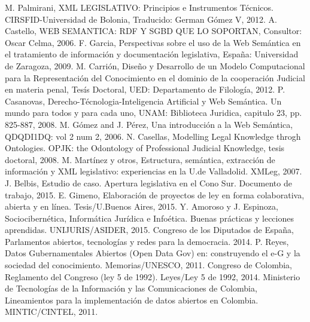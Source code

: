 \documentclass[conference]{IEEEtran}
\begin{document}
	\begin{thebibliography}{1}
		
		M. Palmirani, XML LEGISLATIVO: Principios e Instrumentos Técnicos. CIRSFID-Universidad de Bolonia, Traducido: German Gómez V, 2012. 
		A. Castello, WEB SEMANTICA: RDF Y SGBD QUE LO SOPORTAN, Consultor: Oscar Celma, 2006.
		F. Garcia, Perspectivas sobre el uso de la Web Semántica en el tratamiento de información y documentación legislativa, España: Universidad de Zaragoza, 2009.
		M. Carrión, Diseño y Desarrollo de un Modelo Computacional para la Representación del Conocimiento en el dominio de la cooperación Judicial en materia penal, Tesís Doctoral, UED: Departamento de Filología, 2012.
		P. Casanovas, Derecho-Técnologia-Inteligencia Artificial y Web Semántica. Un mundo para todos y para cada uno, UNAM: Biblioteca Juridica, capitulo 23, pp. 825-887, 2008.
		M. Gómez and J. Pérez, Una introducción a la Web Semántica, QDQDI1DQ: vol 2 num 2, 2006.
		N. Casellas, Modelling Legal Knowledge throgh Ontologies. OPJK: the Odontology of Professional Judicial Knowledge, tesis doctoral, 2008. 
		M. Martínez y otros, Estructura, semántica, extracción de información y XML legislativo: experiencias en la U.de Valladolid. XMLeg, 2007. 	
		J. Belbis, Estudio de caso. Apertura legislativa en el Cono Sur. Documento de trabajo, 2015. 	
		E. Gimeno, Elaboración de proyectos de ley en forma colaborativa, abierta y en línea. Tesis/U.Buenos Aires, 2015.	
	    Y. Amoroso y J. Espinoza, Sociocibernética, Informática Jurídica e Infoética. Buenas prácticas y lecciones aprendidas. UNIJURIS/ASIDER, 2015.
	    Congreso de los Diputados de España, Parlamentos abiertos, tecnologías y redes para la democracia. 2014.    
	    P. Reyes, Datos Gubernamentales Abiertos (Open Data Gov) en: construyendo el e-G y la sociedad del conocimiento. Memorias/UNESCO, 2011.
	    Congreso de Colombia, Reglamento del Congreso (ley 5 de 1992). Leyes/Ley 5 de 1992, 2014. 
	    Ministerio de Tecnologías de la Información y las Comunicaciones de Colombia, Lineamientos para la implementación de datos abiertos en Colombia.  MINTIC/CINTEL, 2011. 
	\end{thebibliography}
\end{document}

